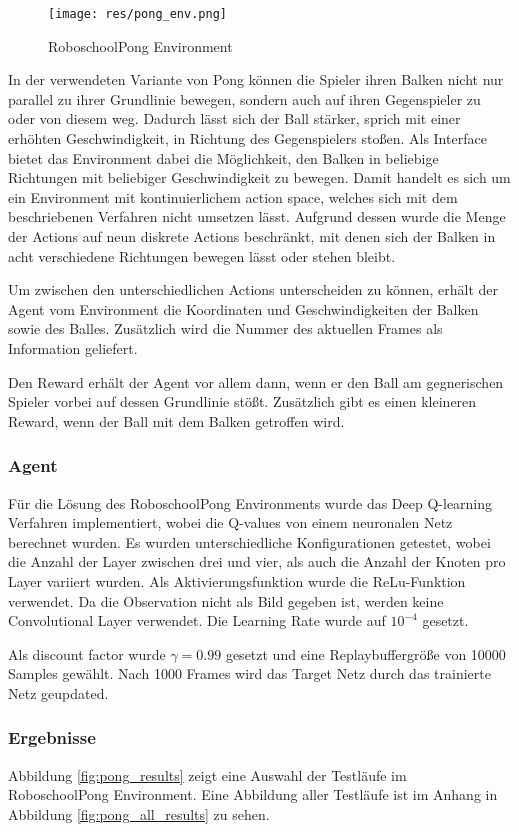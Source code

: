 \documentclass[11pt]{scrartcl}
\begin{document}
\begin{figure}[htp]
\centering
\texttt{[image: res/pong\_env.png]}
\caption{RoboschoolPong Environment}
\label{fig:pong_env}
\end{figure}
\noindent
In der verwendeten Variante von Pong können die Spieler ihren Balken nicht nur parallel zu
ihrer Grundlinie bewegen, sondern auch auf ihren Gegenspieler zu oder von diesem weg.
Dadurch lässt sich der Ball stärker, sprich mit einer erhöhten Geschwindigkeit, in Richtung
des Gegenspielers stoßen. Als Interface bietet das Environment dabei die Möglichkeit, den
Balken in beliebige Richtungen mit beliebiger Geschwindigkeit zu bewegen. Damit handelt es
sich um ein Environment mit kontinuierlichem action space, welches sich mit dem
beschriebenen Verfahren nicht umsetzen lässt. Aufgrund dessen wurde die Menge der Actions auf
neun diskrete Actions beschränkt, mit denen sich der Balken in acht verschiedene Richtungen
bewegen lässt oder stehen bleibt.

Um zwischen den unterschiedlichen Actions unterscheiden zu können, erhält der Agent vom
Environment die Koordinaten und Geschwindigkeiten der Balken sowie des Balles. Zusätzlich
wird die Nummer des aktuellen Frames als Information geliefert.

Den Reward erhält der Agent vor allem dann, wenn er den Ball am gegnerischen Spieler vorbei
auf dessen Grundlinie stößt. Zusätzlich gibt es einen kleineren Reward, wenn der Ball mit
dem Balken getroffen wird.

\subsubsection{Agent}
Für die Lösung des RoboschoolPong Environments wurde das Deep Q-learning Verfahren implementiert,
wobei die Q-values von einem neuronalen Netz berechnet wurden. Es wurden unterschiedliche
Konfigurationen getestet, wobei die Anzahl der Layer zwischen drei und vier, als auch die
Anzahl der Knoten pro Layer variiert wurden. Als Aktivierungsfunktion wurde die
ReLu-Funktion verwendet. Da die Observation nicht als Bild gegeben ist, werden keine
Convolutional Layer verwendet. Die Learning Rate wurde auf $10^{-4}$ gesetzt.

Als discount factor wurde $\gamma = 0.99$ gesetzt und eine Replaybuffergröße von 10000
Samples gewählt. Nach 1000 Frames wird das Target Netz durch das trainierte Netz geupdated.

\subsubsection{Ergebnisse}
Abbildung \ref{fig:pong_results} zeigt eine Auswahl der Testläufe im RoboschoolPong Environment.
Eine Abbildung aller Testläufe ist im Anhang in Abbildung \ref{fig:pong_all_results} zu
sehen.
\end{document}
